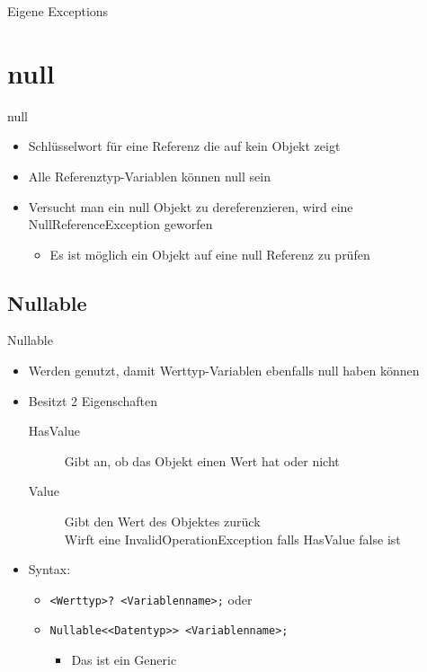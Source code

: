 \begin{frame}{Eigene Exceptions}
	
\end{frame}

\section{null}
\begin{frame}{null}
	\begin{itemize}
		\item Schlüsselwort für eine Referenz die auf kein Objekt zeigt
		\item Alle Referenztyp-Variablen können \alert{null} sein
		\item Versucht man ein \alert{null} Objekt zu dereferenzieren, wird eine NullReferenceException geworfen 
		\begin{itemize}
			\item Es ist möglich ein Objekt auf eine \alert{null} Referenz zu prüfen
		\end{itemize}
	\end{itemize}
		
\end{frame}

\subsection{Nullable}
\begin{frame}{Nullable}
	\begin{itemize}
		\item Werden genutzt, damit Werttyp-Variablen ebenfalls \alert{null} haben können
		\item Besitzt 2 Eigenschaften
		\begin{description}
			\item[HasValue] Gibt an, ob das Objekt einen Wert hat oder nicht
			\item[Value] Gibt den Wert des Objektes zurück\\ Wirft eine InvalidOperationException falls HasValue \alert{false} ist 
		\end{description}
		\item Syntax:
		\begin{itemize}
			\item \texttt{\alert{<Werttyp>}? \alert{<Variablenname>};} oder
			\item \texttt{Nullable<\alert{<Datentyp>}> \alert{<Variablenname>};}
			\begin{itemize}
				\item Das ist ein Generic
			\end{itemize}
		\end{itemize}
	\end{itemize}
\end{frame}

